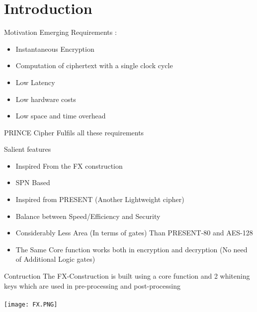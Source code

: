 \section{Introduction}

\begin{frame}{Motivation}
Emerging Requirements :
\begin{itemize}
\item Instantaneous Encryption 
\item Computation of ciphertext with a single clock cycle
\item Low Latency
\item Low hardware costs 
\item Low space and time overhead
\end{itemize}
PRINCE Cipher Fulfils all these requirements  
\end{frame}

\begin{frame}{Salient features}
\begin{itemize}
\item Inspired From the FX construction 
\item SPN Based 
\item Inspired from PRESENT (Another Lightweight cipher)
\item Balance between Speed/Efficiency and Security 
\item Considerably Less Area (In terms of gates) Than PRESENT-80 and AES-128 
\item The Same Core function works both in encryption and decryption (No need of Additional Logic gates)
\end{itemize}

\end{frame}

\begin{frame}{Contruction}
The FX-Construction is built using a core function and 2 whitening keys which are used in pre-processing and post-processing \\ \\ 
\texttt{[image: FX.PNG]}
\end{frame}